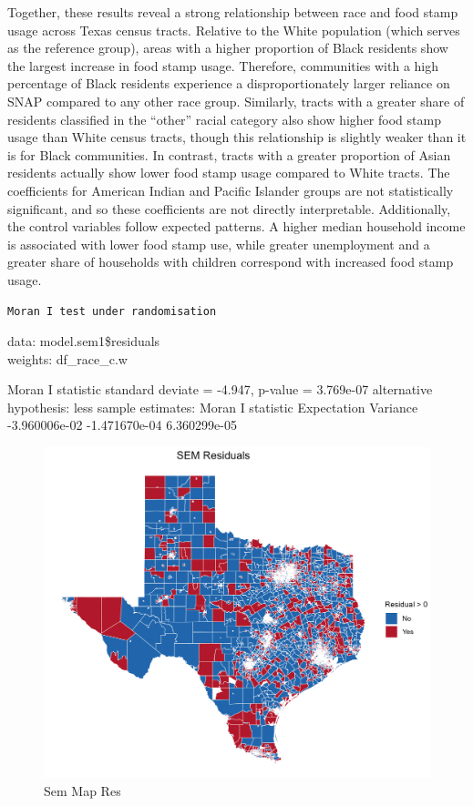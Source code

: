 \documentclass[
]{article}
\begin{document}
Together, these results reveal a strong relationship between race and
food stamp usage across Texas census tracts. Relative to the White
population (which serves as the reference group), areas with a higher
proportion of Black residents show the largest increase in food stamp
usage. Therefore, communities with a high percentage of Black residents
experience a disproportionately larger reliance on SNAP compared to any
other race group. Similarly, tracts with a greater share of residents
classified in the ``other'' racial category also show higher food stamp
usage than White census tracts, though this relationship is slightly
weaker than it is for Black communities. In contrast, tracts with a
greater proportion of Asian residents actually show lower food stamp
usage compared to White tracts. The coefficients for American Indian and
Pacific Islander groups are not statistically significant, and so these
coefficients are not directly interpretable. Additionally, the control
variables follow expected patterns. A higher median household income is
associated with lower food stamp use, while greater unemployment and a
greater share of households with children correspond with increased food
stamp usage.

\begin{verbatim}
Moran I test under randomisation
\end{verbatim}

data: model.sem1\$residuals\\
weights: df\_race\_c.w

Moran I statistic standard deviate = -4.947, p-value = 3.769e-07
alternative hypothesis: less sample estimates: Moran I statistic
Expectation Variance -3.960006e-02 -1.471670e-04 6.360299e-05

\begin{figure}
\centering
\includegraphics{sem_r_map.png}
\caption{Sem Map Res}
\end{figure}
\end{document}
